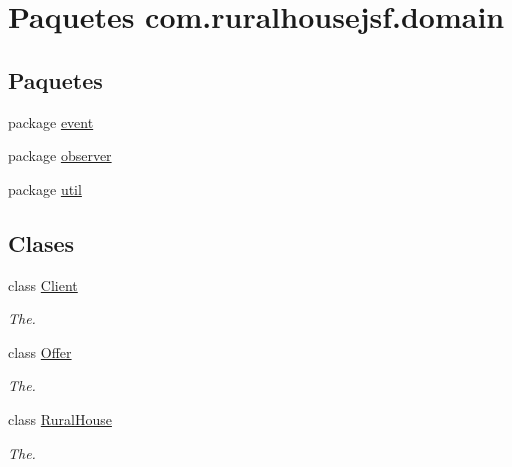 \hypertarget{a00114}{}\section{Paquetes com.\+ruralhousejsf.\+domain}
\label{a00114}
\subsection*{Paquetes}
\begin{DoxyCompactItemize}
\item 
package \mbox{\hyperlink{a00115}{event}}
\item 
package \mbox{\hyperlink{a00116}{observer}}
\item 
package \mbox{\hyperlink{a00117}{util}}
\end{DoxyCompactItemize}
\subsection*{Clases}
\begin{DoxyCompactItemize}
\item 
class \mbox{\hyperlink{a00164}{Client}}
\begin{DoxyCompactList}\small\item\em The. \end{DoxyCompactList}\item 
class \mbox{\hyperlink{a00184}{Offer}}
\begin{DoxyCompactList}\small\item\em The. \end{DoxyCompactList}\item 
class \mbox{\hyperlink{a00188}{Rural\+House}}
\begin{DoxyCompactList}\small\item\em The. \end{DoxyCompactList}\end{DoxyCompactItemize}
